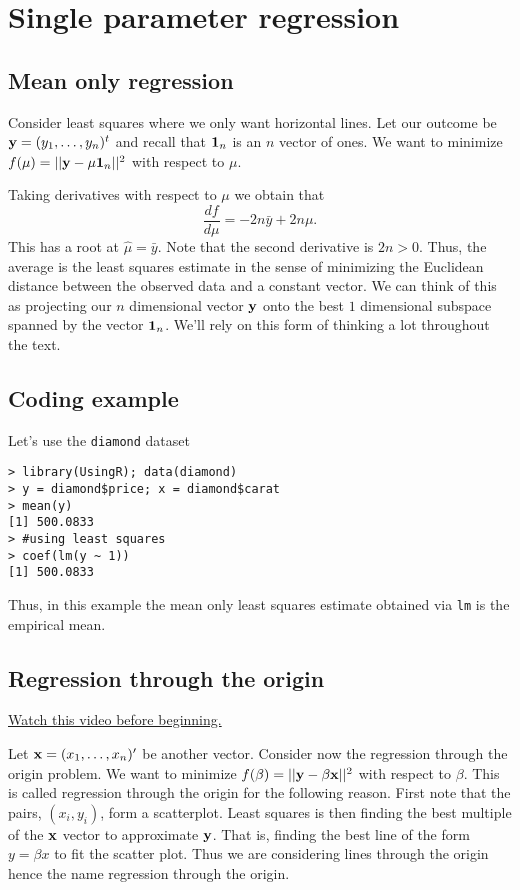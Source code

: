 \chapter{Single parameter regression}

\section{Mean only regression}



Consider least squares where we only want horizontal lines. 
Let our outcome be
$
\mathbf{y} = (y_1,\ldots, y_n)^t
$ and recall that $\mathbf{1}_n$ is an $n$ vector of ones. We want
to minimize 
${f(\mu) = ||\mathbf{y} - \mu \mathbf{1}_n||^2}$ with respect to $\mu$. 

Taking derivatives with respect to $\mu$ we obtain that
$$
\frac{d f}{d\mu} = - 2n \bar y  + 2 n \mu.
$$
This has a root at $\hat \mu = \bar y$. Note that the second
derivative is $2n>0$. 
Thus, the average is the least squares estimate in the
sense of minimizing the Euclidean distance between the
observed data and a constant vector. We can think of this
as projecting our $n$ dimensional vector $\mathbf{y}$ onto the best $1$
dimensional subspace spanned by the vector $\mathbf{1}_n$. We'll
rely on this form of thinking a lot throughout the text.

\section{Coding example}
\href{}{}

Let's use the \texttt{diamond} dataset 
\begin{verbatim}
> library(UsingR); data(diamond)
> y = diamond$price; x = diamond$carat
> mean(y)
[1] 500.0833
> #using least squares
> coef(lm(y ~ 1))
[1] 500.0833
\end{verbatim}

Thus, in this example the mean only least squares estimate obtained via \texttt{lm} 
is the empirical mean.

\section{Regression through the origin}

\href{https://www.youtube.com/watch?v=1ZFED8AcHWc&index=7&list=PLpl-gQkQivXhdgUCdaUQcdb31CRe8Mm2y}{Watch this video before beginning.}

Let $\mathbf{x} = (x_1,\ldots, x_n)'$ be another vector. Consider now the
regression through the origin problem. We want to minimize
$f(\beta) = ||\mathbf{y} - \beta \mathbf{x}||^2$ with respect to $\beta$.
This is called regression through the origin for the following
reason. First note that the pairs, $(x_i, y_i)$,
form a scatterplot. Least squares is then finding the best
multiple of the $\mathbf{x}$ vector to approximate $\mathbf{y}$. That is,
finding the best line of the form $y = \beta x$ to fit
the scatter plot. Thus we are considering lines through the origin
hence the name regression through the origin.

